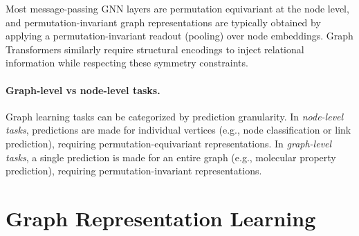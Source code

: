 Most message-passing GNN layers are permutation equivariant at the node level,
and permutation-invariant graph representations are typically obtained by
applying a permutation-invariant readout (pooling) over node embeddings.
Graph Transformers similarly require structural encodings to inject relational
information while respecting these symmetry constraints.
\paragraph{Graph-level vs node-level tasks.}
Graph learning tasks can be categorized by prediction granularity.
In \emph{node-level tasks}, predictions are made for individual vertices
(e.g., node classification or link prediction), requiring permutation-equivariant
representations.
In \emph{graph-level tasks}, a single prediction is made for an entire graph
(e.g., molecular property prediction), requiring permutation-invariant
representations.
\section{Graph Representation Learning}
\label{sec:theory:representations}

